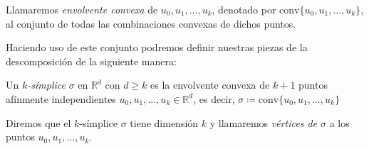 \begin{definition}
\begin{sloppypar}
Llamaremos \emph{envolvente convexa} de $u_0, u_1, ..., u_k$, denotado por ${\text{conv}\{u_0, u_1, ..., u_k\}}$, al conjunto de todas las combinaciones convexas de dichos puntos.
\end{sloppypar}
\end{definition}
Haciendo uso de este conjunto podremos definir nuestras piezas de la descomposición de la siguiente manera:

\begin{definition}
Un \emph{$k$\textit{-símplice}} $\sigma$ en $\mathbb{R}^d$ con $d \geq k$ es la envolvente convexa de $k+1$ puntos afínmente independientes  $u_0, u_1, ..., u_k \in \mathbb{R}^d$, es decir,
$\sigma \coloneqq \text{conv}\{u_0, u_1, ..., u_k\}$
\end{definition}

Diremos que el $k$-símplice $\sigma$ tiene dimensión $k$ y llamaremos \emph{vértices de $\sigma$} a los puntos $u_0, u_1, ..., u_k$.

